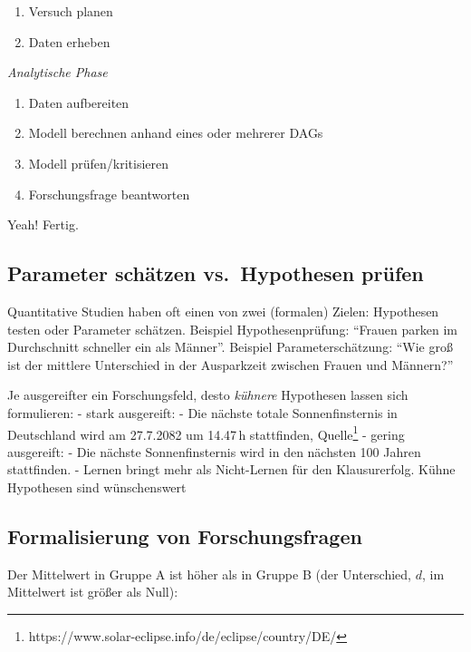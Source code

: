 \documentclass[
  ngerman,
  letterpaper,
  twoside,
  open=any]{scrbook}
\providecommand{\tightlist}{%
  \setlength{\itemsep}{0pt}\setlength{\parskip}{0pt}}\usepackage{longtable,booktabs,array}
\theoremstyle{definition}
\theoremstyle{plain}
\theoremstyle{definition}
\theoremstyle{definition}
\theoremstyle{definition}
\theoremstyle{definition}
\theoremstyle{remark}
\begin{document}
\begin{enumerate}
\def\labelenumi{\arabic{enumi}.}
\setcounter{enumi}{4}
\tightlist
\item
  Versuch planen
\item
  Daten erheben
\end{enumerate}

\emph{Analytische Phase}

\begin{enumerate}
\def\labelenumi{\arabic{enumi}.}
\setcounter{enumi}{6}
\tightlist
\item
  Daten aufbereiten
\item
  Modell berechnen anhand eines oder mehrerer DAGs
\item
  Modell prüfen/kritisieren
\item
  Forschungsfrage beantworten
\end{enumerate}

Yeah! Fertig.

\subsection{Parameter schätzen vs.~Hypothesen
prüfen}\label{parameter-schuxe4tzen-vs.-hypothesen-pruxfcfen}

Quantitative Studien haben oft einen von zwei (formalen) Zielen:
Hypothesen testen oder Parameter schätzen. Beispiel Hypothesenprüfung:
\enquote{Frauen parken im Durchschnitt schneller ein als Männer}.
Beispiel Parameterschätzung: \enquote{Wie groß ist der mittlere
Unterschied in der Ausparkzeit zwischen Frauen und Männern?}

Je ausgereifter ein Forschungsfeld, desto \emph{kühnere} Hypothesen
lassen sich formulieren: - stark ausgereift: - Die nächste totale
Sonnenfinsternis in Deutschland wird am 27.7.2082 um 14.47\,h
stattfinden, Quelle\footnote{https://www.solar-eclipse.info/de/eclipse/country/DE/}
- gering ausgereift: - Die nächste Sonnenfinsternis wird in den nächsten
100 Jahren stattfinden. - Lernen bringt mehr als Nicht-Lernen für den
Klausurerfolg. Kühne Hypothesen sind wünschenswert 🦹

\subsection{Formalisierung von
Forschungsfragen}\label{formalisierung-von-forschungsfragen}

Der Mittelwert in Gruppe A ist höher als in Gruppe B (der Unterschied,
\(d\), im Mittelwert ist größer als Null):
\end{document}
